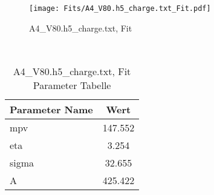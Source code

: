 \begin{figure}[ht] 
 	\centering 
 	\texttt{[image: Fits/A4\_V80.h5\_charge.txt\_Fit.pdf]} 
	\caption{A4_V80.h5_charge.txt, Fit} 
 	\label{fig:A4_V80.h5_charge.txt, Fit} 
\end{figure}
 \\ 
\begin{table}[ht] 
\centering 
\caption{A4_V80.h5_charge.txt, Fit Parameter Tabelle} 
\label{tab:my-table}
\begin{tabular}{|l|c|}
\hline
Parameter Name	&	Wert \\ \hline
mpv	&	 147.552\\ \hline
eta	&	 3.254\\ \hline
sigma	&	 32.655\\ \hline
A	&	 425.422\\ \hline
\end{tabular} 
\end{table}